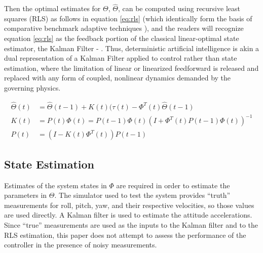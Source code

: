 \documentclass[applsci,article,submit,pdftex,moreauthors]{Definitions/mdpi}
\begin{document}
\begin{paracol}{2}
\linenumbers
\switchcolumn
Then the optimal estimates for $\Theta$, $\hat{\Theta}$, can be computed using recursive least squares (RLS) as follows in equation \ref{eq:rls} \cite{astrom08} (which identically form the basis of comparative benchmark adaptive techniques \cite{Sands17}), and the readers will recognize equation \ref{eq:rls} as the feedback portion of the classical linear-optimal state estimator, the Kalman Filter \cite{Kalman60} - \cite{Kalman61}. Thus, deterministic artificial intelligence is akin a dual representation of a Kalman Filter applied to control rather than state estimation, where the limitation of linear or linearized feedforward is released and replaced with any form of coupled, nonlinear dynamics demanded by the governing physics. 
\begin{linenomath}
\begin{equation}
  \label{eq:rls}
  \begin{aligned}
    \hat{\Theta}(t) &= \hat{\Theta}(t - 1) + K(t)(\tau(t) - \Phi^T(t)\hat{\Theta}(t - 1)\\
    K(t) &= P(t)\Phi(t) = P(t - 1)\Phi(t)(I + \Phi^T(t)P(t - 1)\Phi(t))^{-1}\\
    P(t) &= (I - K(t)\Phi^T(t))P(t - 1)
  \end{aligned}
\end{equation}
\end{linenomath}

\subsection{State Estimation}
Estimates of the system states in $\Phi$ are required in order to estimate the parameters in $\Theta$. The simulator used to test the system provides ``truth'' measurements for roll, pitch, yaw, and their respective velocities, so those values are used directly. A Kalman filter is used to estimate the attitude accelerations. Since ``true'' measurements are used as the inputs to the Kalman filter and to the RLS estimation, this paper does not attempt to assess the performance of the controller in the presence of noisy measurements.


\end{paracol}
\end{document}
